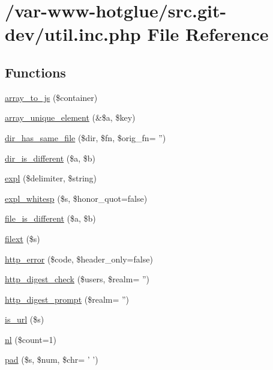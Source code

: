 \hypertarget{util_8inc_8php}{
\section{/var-\/www-\/hotglue/src.git-\/dev/util.inc.php File Reference}
\label{util_8inc_8php}
}
\subsection*{Functions}
\begin{DoxyCompactItemize}
\item 
\hyperlink{util_8inc_8php_a61d3b2881d9368741c71509017724bc8}{array\_\-to\_\-js} (\$container)
\item 
\hyperlink{util_8inc_8php_a4647462c98447c6c2842f70d8c313f85}{array\_\-unique\_\-element} (\&\$a, \$key)
\item 
\hyperlink{util_8inc_8php_a7f3e06b0a6f405290cb4d7990b8ac5c6}{dir\_\-has\_\-same\_\-file} (\$dir, \$fn, \$orig\_\-fn= '')
\item 
\hyperlink{util_8inc_8php_a6309f576f2611237288d0dd3eed09db3}{dir\_\-is\_\-different} (\$a, \$b)
\item 
\hyperlink{util_8inc_8php_aafce787d4b725ac62be6306ff3e352e7}{expl} (\$delimiter, \$string)
\item 
\hyperlink{util_8inc_8php_a1d2500a5e237e59956b03cbea845c95a}{expl\_\-whitesp} (\$s, \$honor\_\-quot=false)
\item 
\hyperlink{util_8inc_8php_a9c9a81ec9dba8b2870cbb365f8139866}{file\_\-is\_\-different} (\$a, \$b)
\item 
\hyperlink{util_8inc_8php_a6d9392e51344c2e8720a0c1982ebea21}{filext} (\$s)
\item 
\hyperlink{util_8inc_8php_ae51039516309f10d5be73220f351e808}{http\_\-error} (\$code, \$header\_\-only=false)
\item 
\hyperlink{util_8inc_8php_aff065fbc9f3abbf9c5a0ebfba22acbf7}{http\_\-digest\_\-check} (\$users, \$realm= '')
\item 
\hyperlink{util_8inc_8php_a95d221746e2d296434b0d63f78cedf57}{http\_\-digest\_\-prompt} (\$realm= '')
\item 
\hyperlink{util_8inc_8php_a0da48011cb68c039aec396c23cb04295}{is\_\-url} (\$s)
\item 
\hyperlink{util_8inc_8php_a9f9eeab2eb9a39518e80609fc7f83842}{nl} (\$count=1)
\item 
\hyperlink{util_8inc_8php_a37ef346387afe0af2cf86a8bea887173}{pad} (\$s, \$num, \$chr= ' ')

\end{DoxyCompactItemize}
